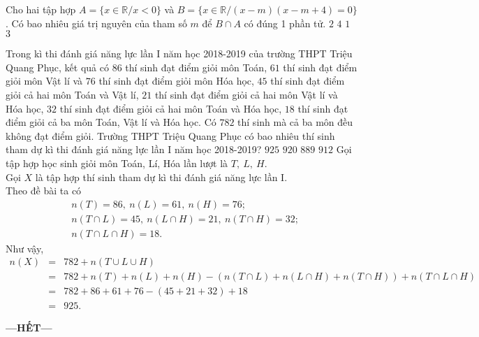 \begin{ex}
	Cho hai tập hợp  $A=\{x \in \mathbb{R}/x<0\}$ và $B=\{x \in \mathbb{R}/(x-m)(x-m+4)=0\}$. Có bao nhiêu giá trị nguyên của tham số $m$ để $B \cap A$ có đúng 1 phần tử.
	\choice
	{$2$}
	{\True $4$}
	{$1$}
	{ $3$}
\end{ex}
\begin{ex}%
	Trong kì thi đánh giá năng lực lần I năm học 2018-2019 của trường THPT Triệu Quang Phục, kết quả có $86$ thí sinh đạt điểm giỏi môn Toán, $61$ thí sinh đạt điểm giỏi môn Vật lí và $76$ thí sinh đạt điểm giỏi môn Hóa học, $45$ thí sinh đạt điểm giỏi cả hai môn Toán và Vật lí, $21$ thí sinh đạt điểm giỏi cả hai môn Vật lí và Hóa học, $32$ thí sinh đạt điểm giỏi cả hai môn Toán và Hóa học, $18$ thí sinh đạt điểm giỏi cả ba môn Toán, Vật lí và Hóa học. Có $782$ thí sinh mà cả ba môn đều không đạt điểm giỏi. Trường THPT Triệu Quang Phục có bao nhiêu thí sinh tham dự kì thi đánh giá năng lực lần I năm học 2018-2019?
	\choice
	{\True $925$}
	{$920$}
	{$889$}
	{$912$}
	\loigiai
	{
		Gọi tập hợp học sinh giỏi môn Toán, Lí, Hóa lần lượt là $T,~L,~H$.\\
		Gọi $X$ là tập hợp thí sinh tham dự kì thi đánh giá năng lực lần I.\\
		Theo đề bài ta có
		\begin{eqnarray*}
			&n(T)=86,~n(L)=61,~n(H)=76;\\
			&n(T\cap L)=45,~n(L\cap H)=21,~n(T\cap H)=32;\\
			&n(T\cap L\cap H)=18.
		\end{eqnarray*}
		Như vậy,
		\begin{eqnarray*}
			n(X)&=&782+n(T\cup L\cup H)\\
			&=&782+n(T)+n(L)+n(H)-(n(T\cap L)+n(L\cap H)+n(T\cap H))+n(T\cap L\cap H)\\
			&=&782+86+61+76-(45+21+32)+18\\
			&=&925.
		\end{eqnarray*}
	}
\end{ex}

\centerline{\textbf{---HẾT---}}
